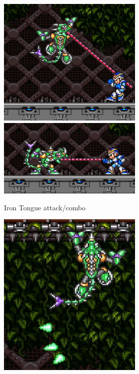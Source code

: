 \begin{figure}[htp]
\begin{figure}[htp]
	\centering
	\begin{subfigure}{\linewidth}
		\centering
		\includegraphics[width=0.4\linewidth]{figures/X1/Sting_chameleon/Chameleon_tongue_1.jpg}
		\includegraphics[width=0.5\linewidth]{figures/X1/Sting_chameleon/Chameleon_tongue_2.jpg}
		\caption{Iron Tongue attack/combo}
	\end{subfigure}
	\begin{subfigure}[t]{0.32\linewidth}
		\centering
		\includegraphics[width=\linewidth]{figures/X1/Sting_chameleon/Chameleon_sting.jpg}

\end{subfigure}
\end{figure}
\end{figure}
